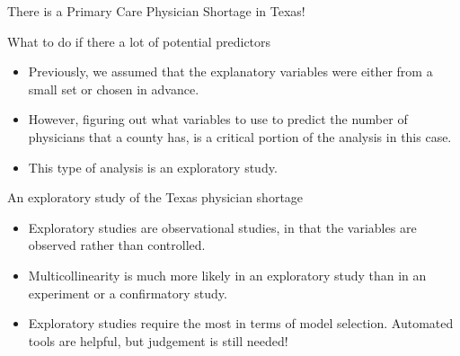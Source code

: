 \documentclass{beamer}\usepackage[]{graphicx}\usepackage[]{color}
\makeatletter
\newcommand{\hlopt}[1]{\textcolor[rgb]{1,0.894,0.769}{#1}}%
\newcommand{\hlstd}[1]{\textcolor[rgb]{1,0.894,0.769}{#1}}%
\newcommand{\hlkwb}[1]{\textcolor[rgb]{0.804,0.776,0.451}{#1}}%
\newcommand{\hlkwd}[1]{\textcolor[rgb]{1,0.78,0.769}{#1}}%
\newenvironment{kframe}{%
 \def\at@end@of@kframe{}%
 \ifinner\ifhmode%
  \def\at@end@of@kframe{\end{minipage}}%
  \begin{minipage}{\columnwidth}%
 \fi\fi%
 \def\FrameCommand##1{\hskip\@totalleftmargin \hskip-\fboxsep
 \colorbox{shadecolor}{##1}\hskip-\fboxsep
     \hskip-\linewidth \hskip-\@totalleftmargin \hskip\columnwidth}%
 \MakeFramed {\advance\hsize-\width
   \@totalleftmargin\z@ \linewidth\hsize
   \@setminipage}}%
 {\par\unskip\endMakeFramed%
 \at@end@of@kframe}
\newenvironment{knitrout}{}{} %
\makeatother
\begin{document}
\begin{darkframes}
\begin{frame}{There is a Primary Care Physician Shortage in Texas!}
      \lc %
    \end{frame}

    \begin{frame}[fragile]{What to do if there a lot of potential predictors}
      \begin{itemize}[<+->]
        \item Previously, we assumed that the explanatory variables were either from a small set or chosen in advance.
        \item However, figuring out what variables to use to predict the number of physicians that a county has, is a critical portion of the analysis in this case.
        \item This type of analysis is an exploratory study.
      \end{itemize} 
    \end{frame}

    \begin{frame}[fragile]{An exploratory study of the Texas physician shortage}
      \begin{itemize}[<+->]
        \item Exploratory studies are observational studies, in that the variables are observed rather than controlled.
        \item Multicollinearity is much more likely in an exploratory study than in an experiment or a confirmatory study.
        \item Exploratory studies require the most in terms of model selection. Automated tools are helpful, but judgement is still needed!
      \end{itemize} 
    \end{frame}

\end{darkframes}
\end{document}

